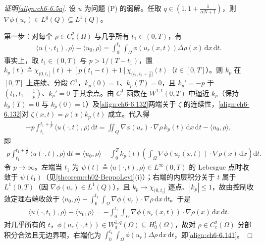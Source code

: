 \documentclass[../../main.tex]{subfiles}%
\begin{document}
\begin{proof}[证明\eqref{align:ch6-6.5a}]
设 $u$ 为问题 (P) 的弱解。任取 $q\in(1,1+\frac{1}{\alpha N+1})$，则 $\nabla\phi(u_r)\in L^q(Q)\subseteq L^1(Q)$。

第一步：对每个 $\rho\in C^2_c(\Omega)$ 与几乎所有 $t_1\in(0,T)$，有
\begin{align}
\langle u(\cdot,t_1),\rho\rangle-\langle u_0,\rho\rangle
=\int_0^{t_1}\int_\Omega\phi(u_r(x,t))\Delta\rho(x)\,\mathrm{d}x\,\mathrm{d}t . \label{align:ch6-6.141}
\end{align}
事实上，取 $t_1\in(0,T)$ 与 $p>1/(T-t_1)$，置 $k_p(t)\triangleq\chi_{(0,t_1]}(t)+[p(t_1-t)+1]\chi_{(t_1,t_1+\frac{1}{p}]}(t)$（$t\in[0,T]$）。则 $k_p$ 在 $[0,T]$ 上连续、分段 $C^1$，$k_p(0)=1$、$k_p(T)=0$，且 $k_p'=-p$ 于 $(t_1,t_1+\frac{1}{p})$、$k_p'=0$ 于其余点。由 $C^1$ 函数在 $W^{1,1}(0,T)$ 中逼近 $k_p$（保持 $k_p(T)=0$ 与 $k_p(0)=1$）及\eqref{align:ch6-6.132}两端关于 $\zeta$ 的连续性，\eqref{align:ch6-6.132}对 $\zeta(x,t)=\rho(x)k_p(t)$ 成立。代入得
\begin{align*}
-p\int_{t_1}^{t_1+\frac{1}{p}}\langle u(\cdot,t),\rho\rangle\,\mathrm{d}t
=\iint_Q\nabla\phi(u_r)\cdot\nabla\rho\,k_p(t)\,\mathrm{d}x\,\mathrm{d}t-\langle u_0,\rho\rangle ,
\end{align*}
即
\begin{align*}
p\int_{t_1}^{t_1+\frac{1}{p}}\langle u(\cdot,t),\rho\rangle\,\mathrm{d}t
=\langle u_0,\rho\rangle-\int_0^Tk_p(t)\left(\int_\Omega\nabla\phi(u_r(x,t))\cdot\nabla\rho(x)\,\mathrm{d}x\right)\mathrm{d}t .
\end{align*}
令 $p\to\infty$。左端当 $t_1$ 为 $\psi(t)\triangleq\langle u(\cdot,t),\rho\rangle\in L^\infty(0,T)$ 的 Lebesgue 点时收敛于 $\psi(t_1)$（见\cref{theorem:ch02-BeppoLevi}(i)）；右端的内层积分关于 $t$ 属于 $L^1(0,T)$（因 $\nabla\phi(u_r)\in L^1(Q)$），且 $k_p\to\chi_{(0,t_1]}$ 逐点、$|k_p|\leqslant1$，故由控制收敛定理右端收敛于 $\langle u_0,\rho\rangle-\int_0^{t_1}\int_\Omega\nabla\phi(u_r)\cdot\nabla\rho\,\mathrm{d}x\,\mathrm{d}t$。于是
\begin{align*}
\langle u(\cdot,t_1),\rho\rangle-\langle u_0,\rho\rangle
=-\int_0^{t_1}\int_\Omega\nabla\phi(u_r(x,t))\cdot\nabla\rho(x)\,\mathrm{d}x\,\mathrm{d}t .
\end{align*}
对几乎所有的 $t$，$\phi(u_r(\cdot,t))\in W^{1,q}_0(\Omega)\subseteq H^1_0(\Omega)$，故对 $\rho\in C^2_c(\Omega)$ 分部积分合法且无边界项，右端化为 $\int_0^{t_1}\int_\Omega\phi(u_r)\Delta\rho\,\mathrm{d}x\,\mathrm{d}t$，即\eqref{align:ch6-6.141}。


\end{proof}
\end{document}
